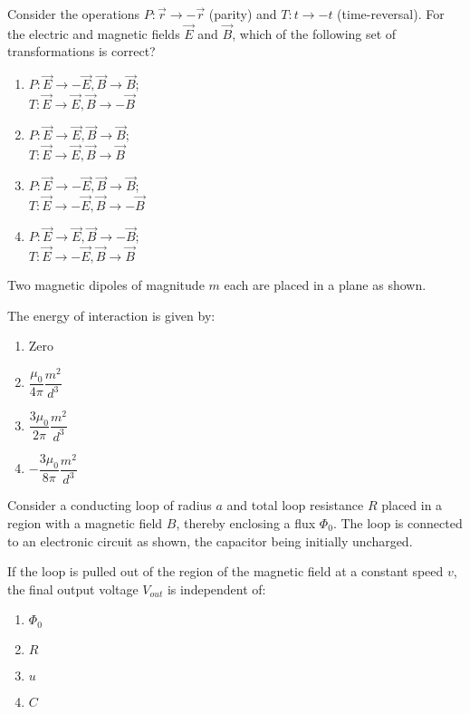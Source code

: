 \item Consider the operations $P: \vec{r} \rightarrow -\vec{r}$ (parity) and $T: t \rightarrow -t$ (time-reversal). For the electric and magnetic fields $\vec{E}$ and $\vec{B}$, which of the following set of transformations is correct?
\begin{multicols}{2}
\begin{enumerate}
\item $P: \vec{E} \to -\vec{E}, \vec{B} \to \vec{B}$;\\ $T: \vec{E} \to \vec{E}, \vec{B} \to -\vec{B}$
\item $P: \vec{E} \to \vec{E}, \vec{B} \to \vec{B}$;\\ $T: \vec{E} \to \vec{E}, \vec{B} \to \vec{B}$
\item $P: \vec{E} \to -\vec{E}, \vec{B} \to \vec{B}$;\\ $T: \vec{E} \to -\vec{E}, \vec{B} \to -\vec{B}$
\item $P: \vec{E} \to \vec{E}, \vec{B} \to -\vec{B}$; \\$T: \vec{E} \to -\vec{E}, \vec{B} \to \vec{B}$
\end{enumerate}
\end{multicols}

\item Two magnetic dipoles of magnitude $m$ each are placed in a plane as shown.


The energy of interaction is given by:
\begin{multicols}{2}
\begin{enumerate}
\item Zero
\item $\dfrac{\mu_0}{4\pi} \dfrac{m^2}{d^3}$
\item $\dfrac{3\mu_0}{2\pi} \dfrac{m^2}{d^3}$
\item $-\dfrac{3\mu_0}{8\pi} \dfrac{m^2}{d^3}$
\end{enumerate}
\end{multicols}

\item Consider a conducting loop of radius $a$ and total loop resistance $R$ placed in a region with a magnetic field $B$, thereby enclosing a flux $\Phi_0$. The loop is connected to an electronic circuit as shown, the capacitor being initially uncharged.


If the loop is pulled out of the region of the magnetic field at a constant speed $v$, the final output voltage $V_{out}$ is independent of:
\begin{multicols}{2}
\begin{enumerate}
 \item $\Phi_0$
 \item $R$
 \item $u$
 \item $C$
 \end{enumerate}
 \end{multicols}

 

